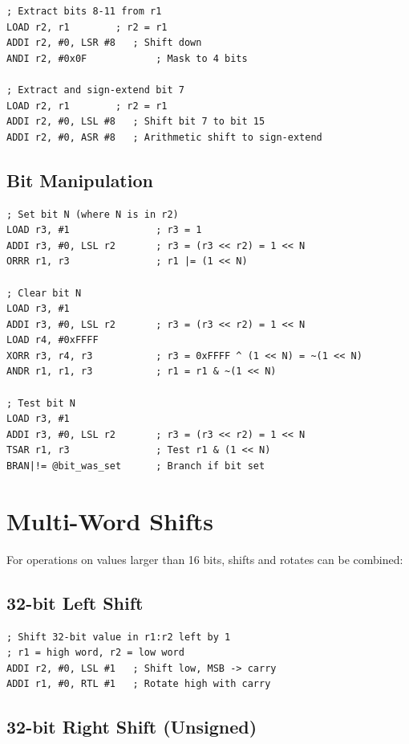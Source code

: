 \begin{lstlisting}
; Extract bits 8-11 from r1
LOAD r2, r1        ; r2 = r1
ADDI r2, #0, LSR #8   ; Shift down
ANDI r2, #0x0F            ; Mask to 4 bits

; Extract and sign-extend bit 7
LOAD r2, r1        ; r2 = r1
ADDI r2, #0, LSL #8   ; Shift bit 7 to bit 15
ADDI r2, #0, ASR #8   ; Arithmetic shift to sign-extend
\end{lstlisting}

\subsection{Bit Manipulation}

\begin{lstlisting}
; Set bit N (where N is in r2)
LOAD r3, #1               ; r3 = 1
ADDI r3, #0, LSL r2       ; r3 = (r3 << r2) = 1 << N
ORRR r1, r3               ; r1 |= (1 << N)

; Clear bit N
LOAD r3, #1
ADDI r3, #0, LSL r2       ; r3 = (r3 << r2) = 1 << N
LOAD r4, #0xFFFF
XORR r3, r4, r3           ; r3 = 0xFFFF ^ (1 << N) = ~(1 << N)
ANDR r1, r1, r3           ; r1 = r1 & ~(1 << N)

; Test bit N
LOAD r3, #1
ADDI r3, #0, LSL r2       ; r3 = (r3 << r2) = 1 << N
TSAR r1, r3               ; Test r1 & (1 << N)
BRAN|!= @bit_was_set      ; Branch if bit set
\end{lstlisting}

\section{Multi-Word Shifts}

For operations on values larger than 16 bits, shifts and rotates can be combined:

\subsection{32-bit Left Shift}

\begin{lstlisting}
; Shift 32-bit value in r1:r2 left by 1
; r1 = high word, r2 = low word
ADDI r2, #0, LSL #1   ; Shift low, MSB -> carry
ADDI r1, #0, RTL #1   ; Rotate high with carry
\end{lstlisting}

\subsection{32-bit Right Shift (Unsigned)}

